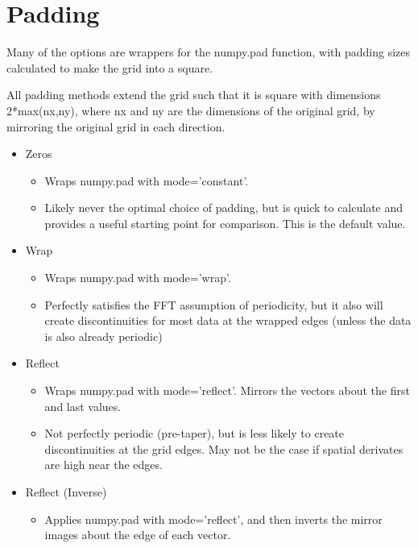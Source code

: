 \documentclass[letterpaper,10pt,english,openany,oneside]{sphinxmanual}
\begin{document}
\section{Padding}
\label{\detokenize{index:padding}}\label{\detokenize{content/preprocessing/padding:padding}}
Many of the options are wrappers for the numpy.pad function, with padding sizes calculated to make the grid into a square.

All padding methods extend the grid such that it is square with dimensions 2*max(nx,ny), where nx and ny are the dimensions of the original grid, by mirroring the original grid in each direction.
\begin{itemize}
\item {} 
Zeros
\begin{itemize}
\item {} 
Wraps numpy.pad with mode=’constant’.

\item {} 
Likely never the optimal choice of padding, but is quick to calculate and provides a useful starting point for comparison. This is the default value.

\end{itemize}

\item {} 
Wrap
\begin{itemize}
\item {} 
Wraps numpy.pad with mode=’wrap’.

\item {} 
Perfectly satisfies the FFT assumption of periodicity, but it also will create discontinuities for most data at the wrapped edges (unless the data is also already periodic)

\end{itemize}

\item {} 
Reflect
\begin{itemize}
\item {} 
Wraps numpy.pad with mode=’reflect’. Mirrors the vectors about the first and last values.

\item {} 
Not perfectly periodic (pre-taper), but is less likely to create discontinuities at the grid edges. May not be the case if spatial derivates are high near the edges.

\end{itemize}

\item {} 
Reflect (Inverse)
\begin{itemize}
\item {} 
Applies numpy.pad with mode=’reflect’, and then inverts the mirror images about the edge of each vector.


\end{itemize}
\end{itemize}
\end{document}
